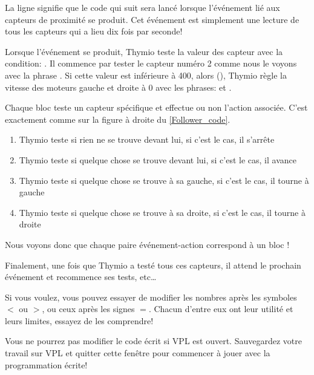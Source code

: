 La ligne  signifie que le code qui suit sera lancé lorsque l'événement lié aux capteurs de proximité se produit. Cet événement est simplement une lecture de tous les capteurs qui a lieu dix fois par seconde!

Lorsque l'événement se produit, Thymio teste la valeur des capteur avec la condition: . Il commence par tester le capteur numéro 2 comme nous le voyons avec la phrase . Si cette valeur est inférieure à 400, alors (), Thymio règle la vitesse des moteurs gauche et droite à 0 avec les phrases:  et .

Chaque bloc  teste un capteur spécifique et effectue ou non l'action associée. C'est exactement comme sur la figure à droite du \cref{Follower_code}.

\begin{enumerate}
	\item Thymio teste si rien ne se trouve devant lui, si c'est le cas, il s'arrête
	\item Thymio teste si quelque chose se trouve devant lui, si c'est le cas, il avance
	\item Thymio teste si quelque chose se trouve à sa gauche, si c'est le cas, il tourne à gauche
	\item Thymio teste si quelque chose se trouve à sa droite, si c'est le cas, il tourne à droite
\end{enumerate}

Nous voyons donc que chaque paire événement-action correspond à un bloc !

Finalement, une fois que Thymio a testé tous ces capteurs, il attend le prochain événement  et recommence ses tests, etc\ldots

Si vous voulez, vous pouvez essayer de modifier les nombres après les symboles $<$ ou $>$, ou ceux après les signes $=$. Chacun d'entre eux ont leur utilité et leurs limites, essayez de les comprendre!

Vous ne pourrez pas modifier le code écrit si VPL est ouvert. Sauvegardez votre travail sur VPL et quitter cette fenêtre pour commencer à jouer avec la programmation écrite!